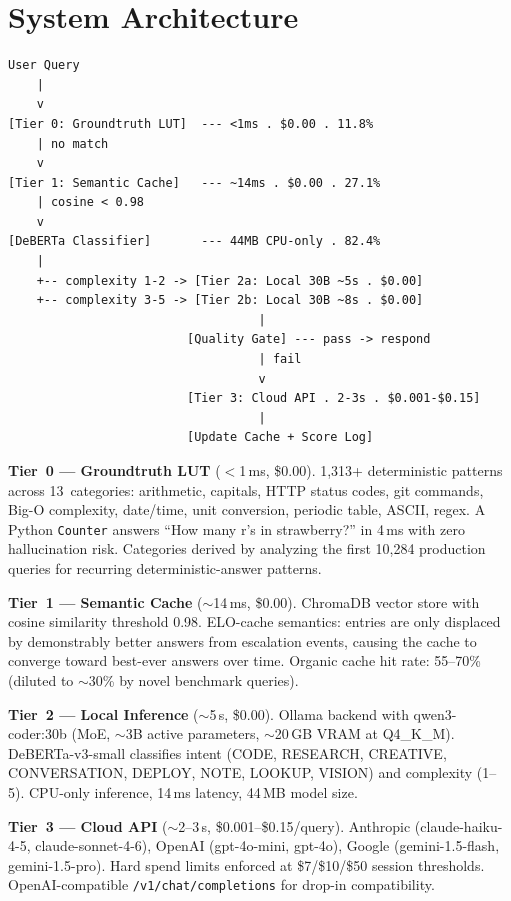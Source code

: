 \documentclass[11pt]{article}
\begin{document}
\section{System Architecture}

\begin{lstlisting}
User Query
    |
    v
[Tier 0: Groundtruth LUT]  --- <1ms . $0.00 . 11.8%
    | no match
    v
[Tier 1: Semantic Cache]   --- ~14ms . $0.00 . 27.1%
    | cosine < 0.98
    v
[DeBERTa Classifier]       --- 44MB CPU-only . 82.4%
    |
    +-- complexity 1-2 -> [Tier 2a: Local 30B ~5s . $0.00]
    +-- complexity 3-5 -> [Tier 2b: Local 30B ~8s . $0.00]
                                   |
                         [Quality Gate] --- pass -> respond
                                   | fail
                                   v
                         [Tier 3: Cloud API . 2-3s . $0.001-$0.15]
                                   |
                         [Update Cache + Score Log]
\end{lstlisting}

\textbf{Tier~0 --- Groundtruth LUT} ($<$1\,ms, \$0.00). 1,313+
deterministic patterns across 13~categories: arithmetic, capitals, HTTP
status codes, git commands, Big-O complexity, date/time, unit
conversion, periodic table, ASCII, regex. A Python \texttt{Counter}
answers ``How many r's in strawberry?'' in 4\,ms with zero hallucination
risk. Categories derived by analyzing the first 10,284 production
queries for recurring deterministic-answer patterns.

\textbf{Tier~1 --- Semantic Cache} ($\sim$14\,ms, \$0.00). ChromaDB
vector store with cosine similarity threshold 0.98. ELO-cache semantics:
entries are only displaced by demonstrably better answers from
escalation events, causing the cache to converge toward best-ever
answers over time. Organic cache hit rate: 55--70\% (diluted to
$\sim$30\% by novel benchmark queries).

\textbf{Tier~2 --- Local Inference} ($\sim$5\,s, \$0.00). Ollama
backend with qwen3-coder:30b (MoE, $\sim$3B active parameters, $\sim$20\,GB
VRAM at Q4\_K\_M). DeBERTa-v3-small classifies intent (CODE, RESEARCH,
CREATIVE, CONVERSATION, DEPLOY, NOTE, LOOKUP, VISION) and complexity
(1--5). CPU-only inference, 14\,ms latency, 44\,MB model size.

\textbf{Tier~3 --- Cloud API} ($\sim$2--3\,s, \$0.001--\$0.15/query).
Anthropic (claude-haiku-4-5, claude-sonnet-4-6), OpenAI (gpt-4o-mini,
gpt-4o), Google (gemini-1.5-flash, gemini-1.5-pro). Hard spend limits
enforced at \$7/\$10/\$50 session thresholds. OpenAI-compatible
\texttt{/v1/chat/completions} for drop-in compatibility.
\end{document}
